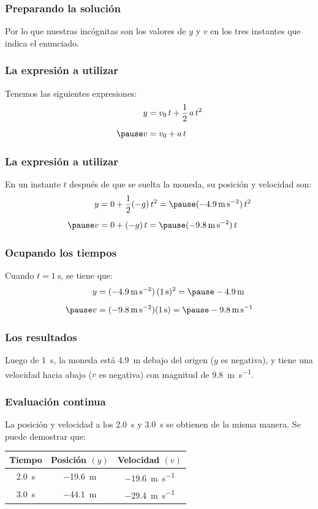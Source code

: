 \documentclass[14pt]{beamer}
\begin{document}
\begin{frame}
\frametitle{Preparando la solución}
Por lo que nuestras incógnitas son los valores de $y$ y $v$ en los tres instantes que indica el enunciado.
\end{frame}
\begin{frame}
\frametitle{La expresión a utilizar}
Tenemos las siguientes expresiones:
\pause
\begin{eqnarray*}
\begin{aligned}
y &= v_{0} \, t + \dfrac{1}{2} \, a \, t^{2} \\[0.5em] \pause
v &= v_{0} + a \, t 
\end{aligned}
\end{eqnarray*}
\end{frame}
\begin{frame}
\frametitle{La expresión a utilizar}
En un instante $t$ después de que se suelta la moneda, su posición y velocidad son:
\pause
\begin{eqnarray*}
\begin{aligned}
y &= 0 + \dfrac{1}{2} (-g) \, t^{2} = \pause (\SI{-4.9}{\meter\per\square\second}) \, t^{2} \\[0.5em] \pause
v &= 0 + (-g) \, t = \pause (\SI{-9.8}{\meter\per\square\second}) \, t
\end{aligned}
\end{eqnarray*}
\end{frame}
\begin{frame}
\frametitle{Ocupando los tiempos}
Cuando $t = \SI{1}{\second}$, se tiene que:
\pause
\begin{eqnarray*}
\begin{aligned}
y &= (\SI{-4.9}{\meter\per\square\second}) \, (\SI{1}{\second})^{2} = \pause \SI{-4.9}{\meter} \\[0.5em] \pause
v &= (\SI{-9.8}{\meter\per\square\second}) (\SI{1}{\second}) = \pause \SI{-9.8}{\meter\per\second}
\end{aligned}
\end{eqnarray*}
\end{frame}
\begin{frame}
\frametitle{Los resultados}
Luego de \SI{1}{\second}, la moneda está \SI{4.9}{\meter} debajo del origen ($y$ es negativa), \pause y tiene una velocidad hacia abajo ($v$ es negativa) con magnitud de \SI{9.8}{\meter\per\second}.
\end{frame}
\begin{frame}
\frametitle{Evaluación continua}
La posición y velocidad a los \SI{2.0}{\second} y \SI{3.0}{\second} se obtienen de la misma manera.
\pause
Se puede demostrar que:
\begin{table}
\centering
\begin{tabular}{c | c | c}
Tiempo & Posición $(y)$& Velocidad $(v)$ \\ \hline
\SI{2.0}{\second} & \SI{-19.6}{\meter} & \SI{-19.6}{\meter\per\second} \\ \hline
\SI{3.0}{\second} & \SI{-44.1}{\meter} & \SI{-29.4}{\meter\per\second} \\ \hline
\end{tabular}
\end{table}
\end{frame}
\end{document}
